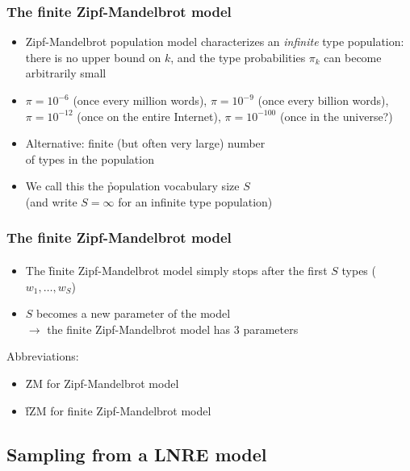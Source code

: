 \documentclass[t]{beamer} %
\begin{document}
\begin{frame}
  \frametitle{The finite Zipf-Mandelbrot model}

  \begin{itemize}
  \item Zipf-Mandelbrot population model characterizes an \emph{infinite} type
    population: there is no upper bound on $k$, and the type probabilities
    $\pi_k$ can become arbitrarily small
  \item $\pi = 10^{-6}$ (once every million words), $\pi = 10^{-9}$ (once
    every billion words), $\pi = 10^{-12}$ (once on the entire Internet), $\pi
    = 10^{-100}$ (once in the universe?)%
    \pause
  \item Alternative: finite (but often very large) number\\
    of types in the population
  \item We call this the \h{population vocabulary size} $S$\\
    (and write $S = \infty$ for an infinite type population)
  \end{itemize}
\end{frame}

\begin{frame}
  \frametitle{The finite Zipf-Mandelbrot model}
  \framesubtitle{\citet{Evert:04}}

  \begin{itemize}
  \item The \h{finite Zipf-Mandelbrot} model simply stops after the first $S$
    types ($w_1, \ldots, w_S$)
  \item $S$ becomes a new parameter of the model\\
    $\to$ the finite Zipf-Mandelbrot model has 3 parameters
  \end{itemize}

  Abbreviations: 
  \begin{itemize}
  \item \h{ZM} for Zipf-Mandelbrot model
  \item \h{fZM} for finite Zipf-Mandelbrot model
  \end{itemize}
\end{frame}

\subsection{Sampling from a LNRE model}
\end{document}
